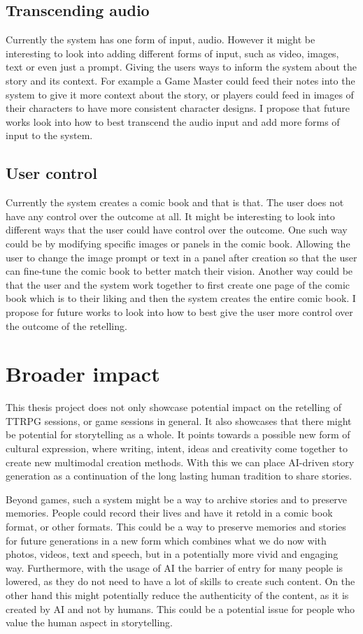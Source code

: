\subsection*{Transcending audio}
Currently the system has one form of input, audio. However it might be interesting to look into adding different forms of input, such as video, images, text or even just a prompt. Giving the users ways to inform the system about the story and its context. For example a Game Master could feed their notes into the system to give it more context about the story, or players could feed in images of their characters to have more consistent character designs. I propose that future works look into how to best transcend the audio input and add more forms of input to the system.

\subsection*{User control}
Currently the system creates a comic book and that is that. The user does not have any control over the outcome at all. It might be interesting to look into different ways that the user could have control over the outcome. One such way could be by modifying specific images or panels in the comic book. Allowing the user to change the image prompt or text in a panel after creation so that the user can fine-tune the comic book to better match their vision. Another way could be that the user and the system work together to first create one page of the comic book which is to their liking and then the system creates the entire comic book. I propose for future works to look into how to best give the user more control over the outcome of the retelling.

\section{Broader impact}
This thesis project does not only showcase potential impact on the retelling of TTRPG sessions, or game sessions in general. It also showcases that there might be potential for storytelling as a whole. It points towards a possible new form of cultural expression, where writing, intent, ideas and creativity come together to create new multimodal creation methods. With this we can place AI-driven story generation as a continuation of the long lasting human tradition to share stories.

Beyond games, such a system might be a way to archive stories and to preserve memories. People could record their lives and have it retold in a comic book format, or other formats. This could be a way to preserve memories and stories for future generations in a new form which combines what we do now with photos, videos, text and speech, but in a potentially more vivid and engaging way. Furthermore, with the usage of AI the barrier of entry for many people is lowered, as they do not need to have a lot of skills to create such content. On the other hand this might potentially reduce the authenticity of the content, as it is created by AI and not by humans. This could be a potential issue for people who value the human aspect in storytelling.

